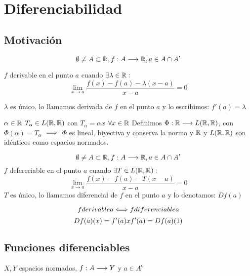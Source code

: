 \chapter{Diferenciabilidad}
\section{Motivación}

$$\emptyset \neq A \subset \mathbb R, \\f: A \longrightarrow \mathbb R, \\a \in A \cap A'$$

$f$ derivable en el punto $a$ cuando $\exists \lambda \in \mathbb R:$
$$\lim_{x\to a} \frac{f(x)-f(a)- \lambda (x-a)}{x-a} = 0$$

$\lambda$ es único, lo llamamos derivada de $f$ en el punto $a$ y lo escribimos: $f'(a) = \lambda$

\begin{prop}[El espacio $L(\R, \R)$]
    $\alpha \in \mathbb R$ $T_\alpha \in L(\mathbb R,\mathbb R)$ con $T_\alpha = \alpha x$ $\forall x \in \mathbb R$
    Definimos $\Phi: \mathbb R \longrightarrow L(\mathbb R,\mathbb R)$, con $\Phi(\alpha) = T_\alpha$ $\implies$ $\Phi$ es lineal, biyectiva y conserva la norma y $\mathbb R$ y $L(\R,\R)$ son idénticos como espacios normados.
\end{prop}

\begin{definicion}
    $$\emptyset \neq A \subset \mathbb R, \\f: A \longrightarrow \mathbb R, \\a \in A \cap A'$$
    $f$ defereciable en el punto $a$ cuando $\exists T \in L(\mathbb R,\mathbb R):$
    $$\lim_{x\to a} \frac{f(x)-f(a)- T (x-a)}{x-a} = 0$$
    $T$ es único, lo llamamos diferencial de $f$ en el punto $a$ y lo denotamos: $Df(a)$
\end{definicion}

\begin{prop}
    $$f \\ derivable \\ a \\ \Longleftrightarrow \\ f \\ diferenciable \\ a$$
    $$Df(a)(x) = f'(a)x \\\\\\ f'(a) = Df(a)(1)$$
\end{prop}

\section{Funciones diferenciables}
\begin{notacion}
    $X,Y$ espacios normados, $f:A\longrightarrow Y$ y $a\in A^o$
\end{notacion}

